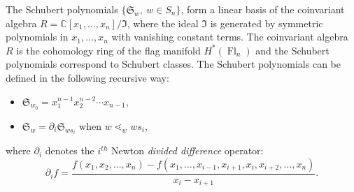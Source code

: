 \documentclass[10pt]{amsart}
\newcommand{\Cbb}{\mathbb{C}}
\newcommand{\I}{\mathfrak{I}}
\DeclareMathOperator{\Fl}{Fl}
\begin{document}
The Schubert polynomials $\{\mathfrak{S}_w,\ w\in S_n\}$, form a linear basis of the coinvariant algebra $R=\Cbb[x_1,\ldots,x_n]/\I$, where the ideal $\I$ is generated by symmetric polynomials in $x_1,\ldots,x_n$ with vanishing constant terms. The coinvariant algebra $R$ is the cohomology ring of the flag manifold $H^*(\Fl_n)$ and the Schubert polynomials correspond to Schubert classes. The Schubert polynomials can be defined in the following recursive way:
\begin{itemize}
\item $\mathfrak{S}_{w_0}=x_1^{n-1}x_2^{n-2}\cdots x_{n-1}$,
\item $\mathfrak{S}_w=\partial_i\mathfrak{S}_{ws_i}$ when $w\lessdot_w ws_i$,
\end{itemize}
where $\partial_i$ denotes the $i^{th}$ Newton \emph{divided difference} operator:
\[
\partial_i f=\frac{f(x_1,x_2,\ldots,x_n)-f(x_1,\ldots,x_{i-1},x_{i+1},x_i,x_{i+2},\ldots,x_n)}{x_i-x_{i+1}}.
\]
\end{document}
